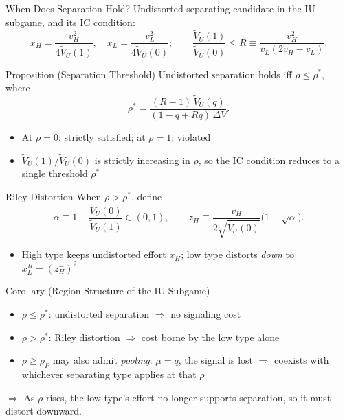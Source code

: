 \documentclass[aspectratio=169, 12pt]{beamer}
\newcommand{\VU}{\widetilde V_U}
\newcommand{\rhosep}{\rho^{*}}
\newcommand{\rhopool}{\rho_{P}}
\begin{document}
\begin{frame}{When Does Separation Hold?}
  Undistorted separating candidate in the IU subgame, and its IC condition:
  \[
    x_H = \frac{v_H^2}{4\VU(1)},
    \quad
    x_L = \frac{v_L^2}{4\VU(0)};
    \qquad
    \frac{\VU(1)}{\VU(0)} \le R
    \equiv \frac{v_H^2}{v_L(2v_H - v_L)}.
  \]

  \begin{block}{Proposition (Separation Threshold)}
    Undistorted separation holds iff $\rho \le \rhosep$, where
    \[
      \rhosep = \frac{(R-1)\,\VU(q)}{(1-q+Rq)\,\Delta V}.
    \]
  \end{block}

  \begin{itemize}
    \item At $\rho = 0$: strictly satisfied; at $\rho = 1$: violated
    \item $\VU(1)/\VU(0)$ is strictly increasing in $\rho$, so the IC
      condition reduces to a single threshold $\rhosep$
  \end{itemize}
\end{frame}

\begin{frame}{Riley Distortion}
  When $\rho > \rhosep$, define
  \[
    \alpha \equiv 1 - \frac{\VU(0)}{\VU(1)} \in (0,1),
    \qquad
    z_H^- \equiv \frac{v_H}{2\sqrt{\VU(0)}}\bigl(1 - \sqrt{\alpha}\bigr).
  \]

  \begin{itemize}
    \item High type keeps undistorted effort $x_H$;
      low type distorts \emph{down} to $x_L^{R} = (z_H^-)^2$
  \end{itemize}

  \begin{block}{Corollary (Region Structure of the IU Subgame)}
    \begin{itemize}\setlength{\itemsep}{0.2em}
      \item $\rho \le \rhosep$: undistorted separation $\Rightarrow$ no signaling cost
      \item $\rho > \rhosep$: Riley distortion $\Rightarrow$ cost borne by the low type alone
      \item $\rho \ge \rhopool$ may also admit \emph{pooling}:
        $\mu = q$, the signal is lost $\Rightarrow$
        coexists with whichever separating type applies at that $\rho$
    \end{itemize}
  \end{block}

  $\Rightarrow$ As $\rho$ rises, the low type's effort no longer supports
  separation, so it must distort downward.
\end{frame}
\end{document}
